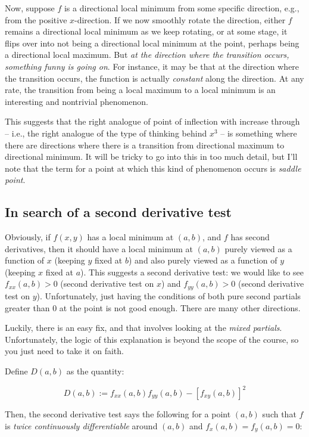 \documentclass[10pt]{amsart}
\begin{document}
Now, suppose $f$ is a directional local minimum from some specific
direction, e.g., from the positive $x$-direction. If we now smoothly
rotate the direction, either $f$ remains a directional local minimum
as we keep rotating, or at some stage, it flips over into not being a
directional local minimum at the point, perhaps being a directional
local maximum. But {\em at the direction where the transition occurs,
something funny is going on}. For instance, it may be that at the
direction where the transition occurs, the function is actually {\em
constant} along the direction. At any rate, the transition from being
a local maximum to a local minimum is an interesting and nontrivial
phenomenon.

This suggests that the right analogue of point of inflection with
increase through -- i.e., the right analogue of the type of thinking
behind $x^3$ -- is something where there are directions where there is
a transition from directional maximum to directional minimum. It will
be tricky to go into this in too much detail, but I'll note that the
term for a point at which this kind of phenomenon occurs is {\em
saddle point}.

\subsection{In search of a second derivative test}

Obviously, if $f(x,y)$ has a local minimum at $(a,b)$, and $f$ has
second derivatives, then it should have a local minimum at $(a,b)$
purely viewed as a function of $x$ (keeping $y$ fixed at $b$) and also
purely viewed as a function of $y$ (keeping $x$ fixed at $a$). This
suggests a second derivative test: we would like to see $f_{xx}(a,b) >
0$ (second derivative test on $x$) and $f_{yy}(a,b) > 0$ (second
derivative test on $y$). Unfortunately, just having the conditions of
both pure second partials greater than $0$ at the point is not good
enough. There are many other directions.

Luckily, there is an easy fix, and that involves looking at the {\em
mixed partials}. Unfortunately, the logic of this explanation is
beyond the scope of the course, so you just need to take it on faith.

Define $D(a,b)$ as the quantity:

$$D(a,b) := f_{xx}(a,b)f_{yy}(a,b) - [f_{xy}(a,b)]^2$$

Then, the second derivative test says the following for a point
$(a,b)$ such that $f$ is {\em twice continuously differentiable}
around $(a,b)$ and $f_x(a,b) = f_y(a,b) = 0$:
\end{document}
